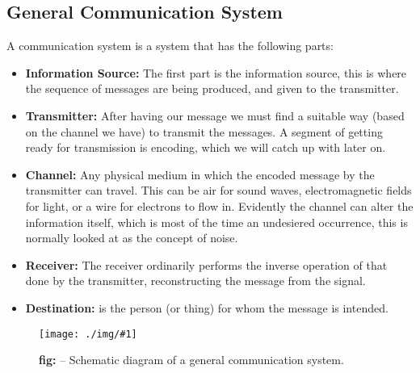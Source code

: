 \documentclass[10pt,a4paper]{article}
\newcounter{figurecounter}
\newcommand{\img}[3]{
    \begin{figure}[h!]
        \centering
        \captionsetup{justification=centering,margin=0cm,labelformat=empty}
        \texttt{[image: ./img/\#1]}
        \label{figure}
        \caption{\small\textbf{fig: \thefigurecounter} -- \textcolor{darkliver}{#3}}
    \end{figure}
    \addtocounter{figurecounter}{1}}
\begin{document}
        \subsection{General Communication System}
            \indent A communication system  is a system that has the following parts:
            \begin{itemize}
                \item \textbf{Information Source:} The first part is the information source, this is where the sequence of messages are being produced, and given to the transmitter.
                \item \textbf{Transmitter:} After having our message we must find a suitable way (based on the channel we have) to transmit the messages. A segment of getting ready for transmission is encoding, which we will catch up with later on.
                \item \textbf{Channel:} Any physical medium in which the encoded message by the transmitter can travel. This can be air for sound waves, electromagnetic fields for light, or a wire for electrons to flow in. Evidently the channel can alter the information itself, which is most of the time an undesiered occurrence, this is normally looked at as the concept of noise.
                \item \textbf{Receiver:} The receiver ordinarily performs the inverse operation of that done by the transmitter, reconstructing the message from the signal.
                \item \textbf{Destination:} is the person (or thing) for whom the message is intended.
            \end{itemize}
            \img{sch-generalcommunicationsystem}{0.7}{Schematic diagram of a general communication system.}
\end{document}
